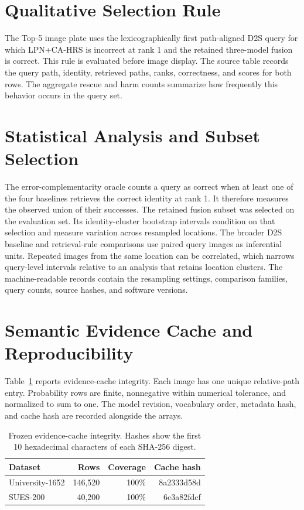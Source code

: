 \documentclass[journal]{IEEEtran}
\begin{document}
\section{Qualitative Selection Rule}

The Top-5 image plate uses the lexicographically first path-aligned D2S query
for which LPN+CA-HRS is incorrect at rank 1 and the retained three-model
fusion is correct.  This rule is evaluated before image display.  The source
table records the query path, identity, retrieved paths, ranks, correctness,
and scores for both rows.  The aggregate rescue and harm counts summarize how frequently this
behavior occurs in the query set.

\section{Statistical Analysis and Subset Selection}

The error-complementarity oracle counts a query as correct when at least
one of the four baselines retrieves the correct identity at rank 1. It
therefore measures the observed union of their successes. The retained
fusion subset was selected on the evaluation set. Its identity-cluster
bootstrap intervals condition on that selection and measure variation
across resampled locations. The broader D2S baseline and retrieval-rule
comparisons use paired query images as inferential units. Repeated images
from the same location can be correlated, which narrows query-level
intervals relative to an analysis that retains location clusters. The
machine-readable records contain the resampling settings, comparison
families, query counts, source hashes, and software versions.

\section{Semantic Evidence Cache and Reproducibility}
\label{app:supp-provenance}

Table~\ref{tab:evidence} reports evidence-cache integrity.  Each image has one unique relative-path entry. Probability rows are
finite, nonnegative within numerical tolerance, and normalized to sum to
one.  The model revision, vocabulary
order, metadata hash, and cache hash are recorded alongside the arrays.

\begin{table}[t]
\centering
\caption{Frozen evidence-cache integrity. Hashes show the first 10
hexadecimal characters of each SHA-256 digest.}
\label{tab:evidence}
\small
\setlength{\tabcolsep}{4pt}
\begin{tabular}{lrrr}
\toprule
Dataset & Rows & Coverage & Cache hash\\
\midrule
University-1652 & 146,520 & 100\% & 8a2333d58d\\
SUES-200        &  40,200 & 100\% & 6c3a82fdcf\\
\bottomrule
\end{tabular}
\end{table}
\end{document}

